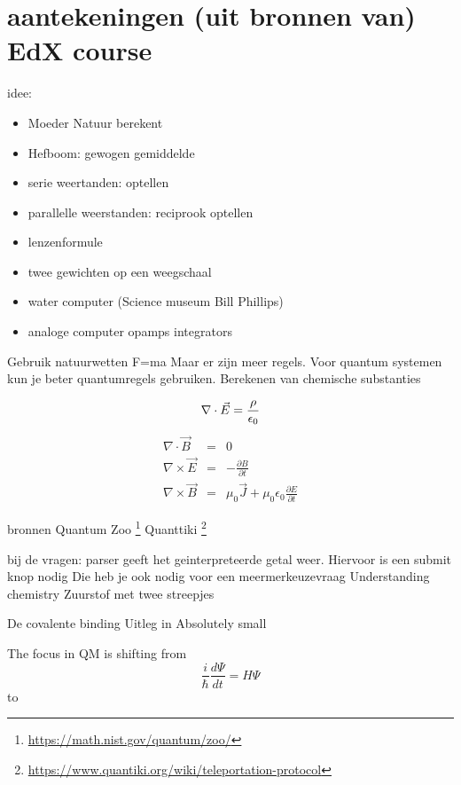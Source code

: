 \documentclass[../../main.tex]{subfiles}
\begin{document}
\section{aantekeningen (uit bronnen van) EdX course}

idee:
\begin{itemize}
\item Moeder Natuur berekent \par
\item Hefboom: gewogen gemiddelde \par
\item serie weertanden: optellen \par
\item parallelle weerstanden: reciprook optellen
\item lenzenformule
\item twee gewichten op een weegschaal
\item water computer (Science museum Bill Phillips)
\item analoge computer opamps integrators
\end{itemize}

Gebruik natuurwetten
F=ma
Maar er zijn meer regels. Voor quantum systemen kun je beter quantumregels gebruiken. Berekenen van chemische substanties

 

\begin{equation}
\nabla \cdot \vec{E} = \frac{\rho}{\epsilon_0}\\
\end{equation}
\begin{eqnarray}
\nabla \cdot \vec{B} &=& 0 \nonumber \\
\nabla \times \vec{E} &=& - \frac{\partial B}{\partial t} \nonumber \\
\nabla \times \vec{B} &=& \mu_{0}\vec{J} +
\mu_{0}\epsilon_{0}\frac{\partial E}{\partial t}
\end{eqnarray}

bronnen
Quantum Zoo \footnote{\url{https://math.nist.gov/quantum/zoo/}}
Quanttiki \footnote{\url{https://www.quantiki.org/wiki/teleportation-protocol}}

bij de vragen: parser geeft het geinterpreteerde getal weer.
Hiervoor is een submit knop nodig
Die heb je ook nodig voor een meermerkeuzevraag
Understanding chemistry
Zuurstof met twee streepjes

De covalente binding Uitleg in Absolutely small

The focus in QM is shifting from $$\frac{i}{\hbar}\frac{d\Psi}{dt}= H \Psi$$
to
 
\end{document}
